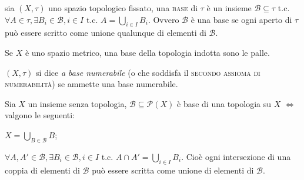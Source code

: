 \documentclass{article}
\begin{document}
\begin{defn}
	sia $(X, \tau)$ uno spazio topologico fissato, una \textsc{base} di $\tau$ è
	un insieme $\mathcal{B} \subseteq \tau$ t.c. $\forall A \in \tau, \exists
	B_i \in \mathcal{B}, i \in I$ t.c. $A= \bigcup_{i \in I} B_i$. Ovvero
	$\mathcal{B}$ \`e una base se ogni aperto di $\tau$ pu\`o essere scritto
	come unione qualunque di elementi di $\mathcal{B}$.
\end{defn}

\begin{ex}
	Se $X$ è uno spazio metrico, una base della topologia indotta sono le palle.
\end{ex}

\begin{defn} \label{N2}
	$(X, \tau)$ si dice \textit{a base numerabile} (o che soddisfa il
	\textsc{secondo assioma di numerabilità}) se ammette una base numerabile.
\end{defn}

\begin{prop} \label{prop:base}
	Sia $X$ un insieme senza topologia, $\mathcal{B} \subseteq \mathcal{P}(X)$ è
	base di una topologia su $X$ $\Leftrightarrow$ valgono le seguenti:
	\begin{nlist}
		\item \label{i_prop} $\displaystyle X=\bigcup_{B \in \mathcal{B}} B$;
		\item $\forall A, A' \in \mathcal{B}, \exists B_i \in \mathcal{B}, i \in
		I$ t.c. $A \cap A'= \bigcup_{i \in I} B_i$. Cio\`e ogni intersezione di
		una coppia di elementi di $\mathcal{B}$ pu\`o essere scritta come unione
		di elementi di $\mathcal{B}$.
	\end{nlist}
\end{prop}
\end{document}
